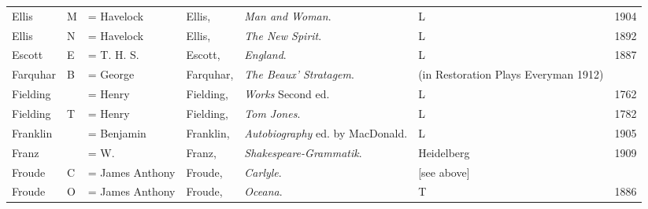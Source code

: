 \begin{sidewaystable}
\begin{tabular}{p{} p{} p{} p{} p{} p{} p{}}
Ellis & M & = Havelock & Ellis, & \textit{Man and Woman}. & L & 1904 \\
Ellis & N & = Havelock & Ellis, & \textit{The New Spirit}. & L & 1892 \\
Escott & E & = T. H. S. & Escott, & \textit{England}. & L & 1887 \\
Farquhar & B & = George & Farquhar, & \textit{The Beaux' Stratagem}. & (in Restoration Plays Everyman 1912) & \\
Fielding & & = Henry & Fielding, & \textit{Works} Second ed. & L & 1762 \\
Fielding & T & = Henry & Fielding, & \textit{Tom Jones}. & L & 1782 \\
Franklin & & = Benjamin & Franklin, & \textit{Autobiography} ed. by MacDonald. & L & 1905 \\
Franz & & = W. & Franz, & \textit{Shakespeare-Grammatik}. & Heidelberg & 1909 \\
Froude & C & = James Anthony & Froude, & \textit{Carlyle}. & [see above] & \\
Froude & O & = James Anthony & Froude, & \textit{Oceana}. & T & 1886 \\
\end{tabular}
\end{sidewaystable}

